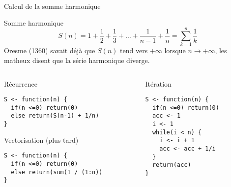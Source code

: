 \documentclass[10pt]{beamer}
\begin{document}
\begin{frame}[fragile]{Calcul de la somme harmonique}

  \begin{block}{Somme harmonique}
    $$
    S(n) = 1 + \frac{1}{2} + \frac{1}{3} + \ldots + \frac{1}{n-1} + \frac{1}{n}
    = \sum_{k=1}^n \frac{1}{k}
    $$
    Oresme (1360) savait déjà que $S(n)$ tend vers $+\infty$ lorsque $n \rightarrow +\infty$, les matheux disent que la série harmonique diverge.
  \end{block}


\begin{columns}[t]
\begin{column}{0.48\textwidth}
  \begin{block}{Récurrence}
    \begin{lstlisting}[style=edblock]
S <- function(n) {
  if(n <=0) return(0)
  else return(S(n-1) + 1/n)
}
\end{lstlisting}
\end{block}
\begin{block}{Vectorisation (plus tard)}
    \begin{lstlisting}[style=edblock]
S <- function(n) {
  if(n <=0) return(0)
  else return(sum(1 / (1:n))
}
\end{lstlisting}
  \end{block}

\end{column}
\begin{column}{0.48\textwidth}
  \begin{block}{Itération}
    \begin{lstlisting}[style=edblock]
S <- function(n) {
  if(n <=0) return(0)
  acc <- 1
  i <- 1
  while(i < n) {
    i <- i + 1
    acc <- acc + 1/i
  }
  return(acc)
}
\end{lstlisting}
  \end{block}
\end{column}
\end{columns}
\end{frame}



\end{document}
